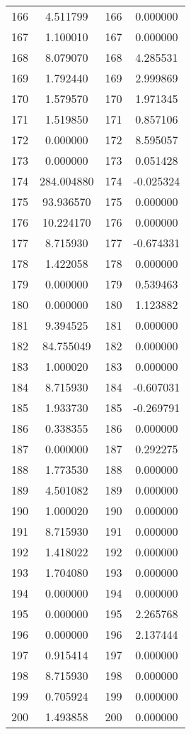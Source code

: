 \documentclass[12pt]{article}
\begin{document}
\begin{longtable}{@{}cccc@{}}
166 & 4.511799 & 166 & 0.000000 \\
167 & 1.100010 & 167 & 0.000000 \\
168 & 8.079070 & 168 & 4.285531 \\
169 & 1.792440 & 169 & 2.999869 \\
170 & 1.579570 & 170 & 1.971345 \\
171 & 1.519850 & 171 & 0.857106 \\
172 & 0.000000 & 172 & 8.595057 \\
173 & 0.000000 & 173 & 0.051428 \\
174 & 284.004880 & 174 & -0.025324 \\
175 & 93.936570 & 175 & 0.000000 \\
176 & 10.224170 & 176 & 0.000000 \\
177 & 8.715930 & 177 & -0.674331 \\
178 & 1.422058 & 178 & 0.000000 \\
179 & 0.000000 & 179 & 0.539463 \\
180 & 0.000000 & 180 & 1.123882 \\
181 & 9.394525 & 181 & 0.000000 \\
182 & 84.755049 & 182 & 0.000000 \\
183 & 1.000020 & 183 & 0.000000 \\
184 & 8.715930 & 184 & -0.607031 \\
185 & 1.933730 & 185 & -0.269791 \\
186 & 0.338355 & 186 & 0.000000 \\
187 & 0.000000 & 187 & 0.292275 \\
188 & 1.773530 & 188 & 0.000000 \\
189 & 4.501082 & 189 & 0.000000 \\
190 & 1.000020 & 190 & 0.000000 \\
191 & 8.715930 & 191 & 0.000000 \\
192 & 1.418022 & 192 & 0.000000 \\
193 & 1.704080 & 193 & 0.000000 \\
194 & 0.000000 & 194 & 0.000000 \\
195 & 0.000000 & 195 & 2.265768 \\
196 & 0.000000 & 196 & 2.137444 \\
197 & 0.915414 & 197 & 0.000000 \\
198 & 8.715930 & 198 & 0.000000 \\
199 & 0.705924 & 199 & 0.000000 \\
200 & 1.493858 & 200 & 0.000000 \\

\end{longtable}
\end{document}
